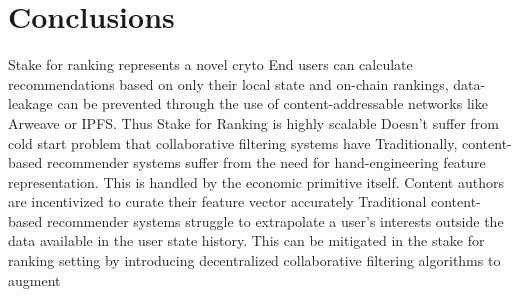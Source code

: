 \section{Conclusions}

Stake for ranking represents a novel cryto
End users can calculate recommendations based on only their local state and on-chain rankings, data-leakage can be prevented through the use of content-addressable networks like Arweave or IPFS. Thus Stake for Ranking is highly scalable
Doesn’t suffer from cold start problem that collaborative filtering systems have
Traditionally, content-based recommender systems suffer from the need for hand-engineering feature representation. This is handled by the economic primitive itself. Content authors are incentivized to curate their feature vector accurately
Traditional content-based recommender systems struggle to extrapolate a user’s interests outside the data available in the user state history. This can be mitigated in the stake for ranking setting by introducing decentralized collaborative filtering algorithms to augment 